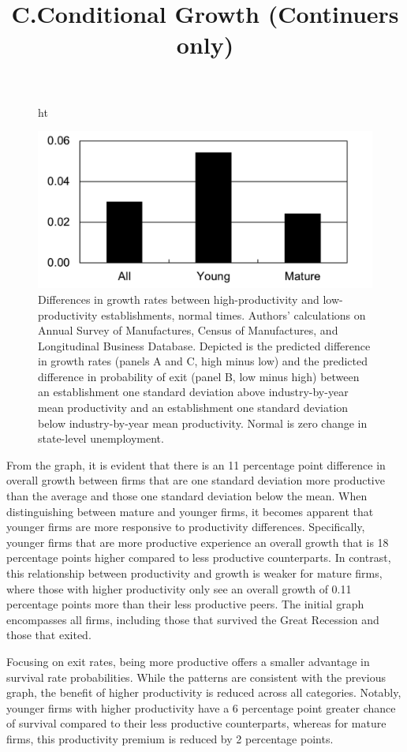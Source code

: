 \documentclass[12pt]{article}
\begin{document}
\begin{figure}{ht}
    \centering
    \title{C.Conditional Growth (Continuers only)}
    \includegraphics[scale = 0.35]{Plot1.5.png}
    
    \label{plot:1.3}
    \caption{Differences in growth rates between high-productivity and low-
    productivity establishments, normal times. Authors' calculations on Annual Survey
    of Manufactures, Census of Manufactures, and Longitudinal Business Database.
    Depicted is the predicted difference in growth rates (panels A and C, high minus
    low) and the predicted difference in probability of exit (panel B, low minus high)
    between an establishment one standard deviation above industry-by-year mean
    productivity and an establishment one standard deviation below industry-by-year
    mean productivity. Normal is zero change in state-level unemployment.
    }
\end{figure} 
From the graph, it is evident that there is an 11 percentage point difference in overall growth between firms that are
one standard deviation more productive than the average and those one standard deviation below the mean. When
distinguishing between mature and younger firms, it becomes apparent that younger firms are more responsive to
productivity differences. Specifically, younger firms that are more productive experience an overall growth that is 18
percentage points higher compared to less productive counterparts. In contrast, this relationship between productivity
and growth is weaker for mature firms, where those with higher productivity only see an overall growth of 0.11
percentage points more than their less productive peers. The initial graph encompasses all firms, including those that
survived the Great Recession and those that exited. 

Focusing on exit rates, being more productive offers a smaller advantage in survival rate probabilities. While the
patterns are consistent with the previous graph, the benefit of higher productivity is reduced across all categories.
Notably, younger firms with higher productivity have a 6 percentage point greater chance of survival compared to their
less productive counterparts, whereas for mature firms, this productivity premium is reduced by 2 percentage points. 
\end{document}
